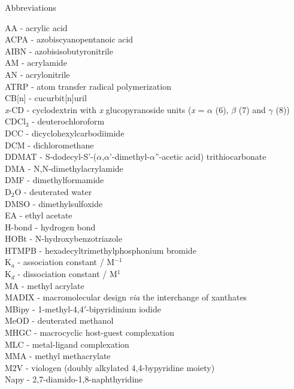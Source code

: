\documentclass[a4wide,12pt]{report} %
\begin{document}
\newpage
\begin{center}
\Large{Abbreviations}
\end{center}
\noindent
AA - acrylic acid\\
ACPA - azobiscyanopentanoic acid\\
AIBN - azobisisobutyronitrile\\
AM - acrylamide\\
AN - acrylonitrile\\
ATRP - atom transfer radical polymerization\\
CB[n] - cucurbit[n]uril\\
{\it x}-CD - cyclodextrin with {\it x} glucopyranoside units ({\it x} = $\alpha$ (6), $\beta$ (7) and $\gamma$ (8))\\
CDCl$_3$ - deuterochloroform\\
DCC - dicyclohexylcarbodiimide\\
DCM - dichloromethane\\
DDMAT - S-dodecyl-S'-($\alpha$,$\alpha$'-dimethyl-$\alpha$''-acetic acid) trithiocarbonate\\
DMA - N,N-dimethylacrylamide\\
DMF - dimethylformamide\\
D$_2$O - deuterated water\\
DMSO - dimethylsulfoxide\\
EA - ethyl acetate\\
H-bond - hydrogen bond\\
HOBt - N-hydroxybenzotriazole\\
HTMPB - hexadecyltrimethylphosphonium bromide\\
K$_a$ - association constant / M$^{-1}$\\
K$_d$ - dissociation constant / M$^{1}$\\
MA - methyl acrylate\\
MADIX - macromolecular design {\it via} the interchange of xanthates\\
MBipy - 1-methyl-4,4$'$-bipyridinium iodide\\
MeOD - deuterated methanol\\
MHGC - macrocyclic host-guest complexation\\
MLC - metal-ligand complexation\\
MMA - methyl methacrylate\\
M2V - viologen (doubly alkylated 4,4-bypyridine moiety)\\
Napy - 2,7-diamido-1,8-naphthyridine\\
\end{document}
